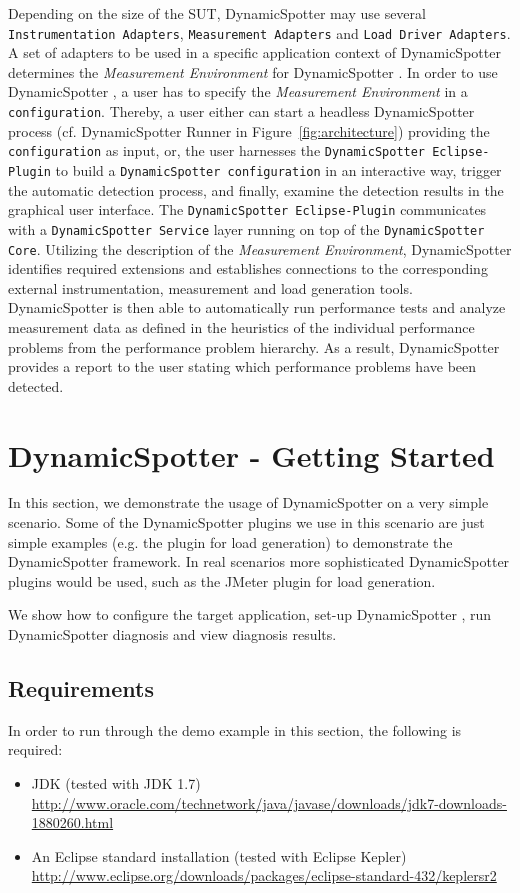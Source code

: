 \documentclass{report}
\newcommand{\DS}{DynamicSpotter }
\newcommand{\link}[1]{\textcolor[rgb]{0.0,0.0,1.0}{\href{#1}{#1}}}
\begin{document}
Depending on the size of the SUT, \DS may use several \texttt{Instrumentation Adapters}, \texttt{Measurement Adapters}
and \texttt{Load Driver Adapters}. A set of adapters to be used in a specific application context of \DS determines the
\emph{Measurement Environment} for \DS. In order to use \DS, a user has to specify the \emph{Measurement Environment} in
a \texttt{configuration}. Thereby, a user either can start a headless \DS process (cf. \DS Runner in Figure~\ref{fig:architecture})
providing the \texttt{configuration} as input, or, the user harnesses the \texttt{\DS Eclipse-Plugin} to build a \texttt{\DS configuration} in an interactive
way, trigger the automatic detection process, and finally, examine the detection results in the graphical user
interface. The \texttt{\DS Eclipse-Plugin} communicates with a \texttt{\DS Service} layer running on top of
the \texttt{\DS Core}. Utilizing the description of the \emph{Measurement Environment}, \DS identifies required
extensions and establishes connections to the corresponding external instrumentation, measurement and load generation
tools. \DS is then able to automatically run performance tests and analyze measurement data as defined in the heuristics
of the individual performance problems from the performance problem hierarchy. As a result, \DS provides a report to the
user stating which performance problems have been detected.  

\section{DynamicSpotter - Getting Started}
In this section, we demonstrate the usage of \DS on a very simple scenario. Some of the \DS plugins we use in this
scenario are just simple examples (e.g. the plugin for load generation) to demonstrate the \DS framework. In real
scenarios more sophisticated \DS plugins would be used, such as the JMeter plugin for load generation.

We show how to configure the target application, set-up \DS, run \DS diagnosis and view diagnosis
results.


\subsection{Requirements}
In order to run through the demo example in this section, the following is required:
\begin{itemize}
  \item JDK (tested with JDK 1.7)
  \\ \link{http://www.oracle.com/technetwork/java/javase/downloads/jdk7-downloads-1880260.html}
  \item An Eclipse standard installation (tested with Eclipse Kepler) 
  \\ \link{http://www.eclipse.org/downloads/packages/eclipse-standard-432/keplersr2}
\end{itemize}
\end{document}
